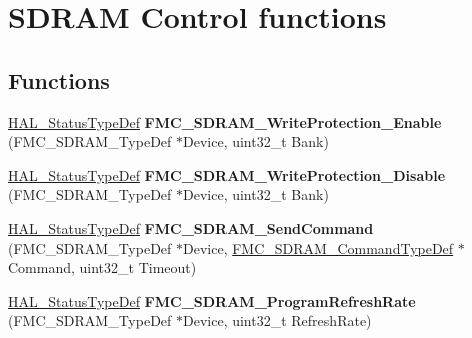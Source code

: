 \hypertarget{group___f_m_c___l_l___s_d_r_a_m___private___functions___group2}{}\section{S\+D\+R\+AM Control functions}
\label{group___f_m_c___l_l___s_d_r_a_m___private___functions___group2}
\subsection*{Functions}
\begin{DoxyCompactItemize}
\item 
\hyperlink{stm32f4xx__hal__def_8h_a63c0679d1cb8b8c684fbb0632743478f}{H\+A\+L\+\_\+\+Status\+Type\+Def} {\bfseries F\+M\+C\+\_\+\+S\+D\+R\+A\+M\+\_\+\+Write\+Protection\+\_\+\+Enable} (F\+M\+C\+\_\+\+S\+D\+R\+A\+M\+\_\+\+Type\+Def $\ast$Device, uint32\+\_\+t Bank)\hypertarget{group___f_m_c___l_l___s_d_r_a_m___private___functions___group2_gae479dff64b562136b1630ece63af9e98}{}\label{group___f_m_c___l_l___s_d_r_a_m___private___functions___group2_gae479dff64b562136b1630ece63af9e98}

\item 
\hyperlink{stm32f4xx__hal__def_8h_a63c0679d1cb8b8c684fbb0632743478f}{H\+A\+L\+\_\+\+Status\+Type\+Def} {\bfseries F\+M\+C\+\_\+\+S\+D\+R\+A\+M\+\_\+\+Write\+Protection\+\_\+\+Disable} (F\+M\+C\+\_\+\+S\+D\+R\+A\+M\+\_\+\+Type\+Def $\ast$Device, uint32\+\_\+t Bank)\hypertarget{group___f_m_c___l_l___s_d_r_a_m___private___functions___group2_ga277d3d1a938a9482d66a14cd45ed1305}{}\label{group___f_m_c___l_l___s_d_r_a_m___private___functions___group2_ga277d3d1a938a9482d66a14cd45ed1305}

\item 
\hyperlink{stm32f4xx__hal__def_8h_a63c0679d1cb8b8c684fbb0632743478f}{H\+A\+L\+\_\+\+Status\+Type\+Def} {\bfseries F\+M\+C\+\_\+\+S\+D\+R\+A\+M\+\_\+\+Send\+Command} (F\+M\+C\+\_\+\+S\+D\+R\+A\+M\+\_\+\+Type\+Def $\ast$Device, \hyperlink{struct_f_m_c___s_d_r_a_m___command_type_def}{F\+M\+C\+\_\+\+S\+D\+R\+A\+M\+\_\+\+Command\+Type\+Def} $\ast$Command, uint32\+\_\+t Timeout)\hypertarget{group___f_m_c___l_l___s_d_r_a_m___private___functions___group2_gad35de253de4db9128388a51e4ba56e8f}{}\label{group___f_m_c___l_l___s_d_r_a_m___private___functions___group2_gad35de253de4db9128388a51e4ba56e8f}

\item 
\hyperlink{stm32f4xx__hal__def_8h_a63c0679d1cb8b8c684fbb0632743478f}{H\+A\+L\+\_\+\+Status\+Type\+Def} {\bfseries F\+M\+C\+\_\+\+S\+D\+R\+A\+M\+\_\+\+Program\+Refresh\+Rate} (F\+M\+C\+\_\+\+S\+D\+R\+A\+M\+\_\+\+Type\+Def $\ast$Device, uint32\+\_\+t Refresh\+Rate)\hypertarget{group___f_m_c___l_l___s_d_r_a_m___private___functions___group2_gaf8704a78ec9ae7b0fa92dd5ae5df95e0}{}\label{group___f_m_c___l_l___s_d_r_a_m___private___functions___group2_gaf8704a78ec9ae7b0fa92dd5ae5df95e0}


\end{DoxyCompactItemize}
